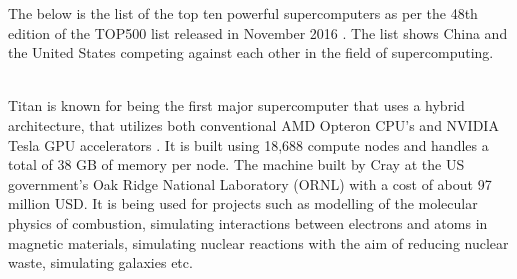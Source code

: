 \documentclass[fleqn,letterpaper,12pt]{report}
\begin{document}
\assignmenttitle

%
{}
\problem
The below is the list of the top ten powerful supercomputers as per the 48th edition of the TOP500 list released in November 2016 \cite{SC16}. The list shows China and the United States competing against each other in the field of supercomputing.
\begin{table}[h!]
\centering
\caption{Top 10 most powerful supercomputers, SC16, November, 2016}
\label{my-label}
\end{table}
%
\\
Titan is known for being the first major supercomputer that uses a hybrid architecture, that utilizes both conventional AMD Opteron CPU's and NVIDIA Tesla GPU accelerators \cite{titan}. It is built using 18,688 compute nodes and handles a total of 38 GB of memory per node. The machine built by Cray at the US government's Oak Ridge National Laboratory (ORNL) with a cost of about 97 million USD. It is being used for projects such as modelling of the molecular physics of combustion, simulating interactions between electrons and atoms in magnetic materials, simulating nuclear reactions with the aim of reducing nuclear waste, simulating galaxies etc.
\end{document}
